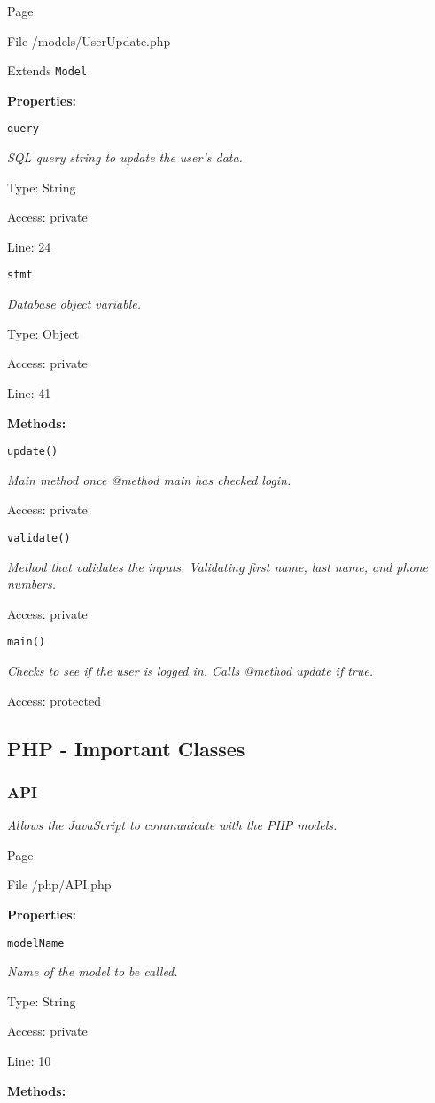 Page \pageref{UserUpdate.php}

File /models/UserUpdate.php

Extends \texttt{Model}

\textbf{Properties:}

\texttt{query}

{\scriptsize
\textit{SQL query string to update the user's data.}

Type: String

Access: private

Line: 24

}
\texttt{stmt}

{\scriptsize
\textit{Database object variable.}

Type: Object

Access: private

Line: 41

}
\textbf{Methods:}

\texttt{update()}

{\scriptsize
\textit{Main method once @method main has checked login.}

Access: private

}

\texttt{validate()}

{\scriptsize
\textit{Method that validates the inputs.
Validating first name, last name, and phone numbers.}

Access: private

}

\texttt{main()}

{\scriptsize
\textit{Checks to see if the user is logged in.
Calls @method update if true.}

Access: protected

}

\subsection{PHP - Important Classes}
\subsubsection{API}
\textit{Allows the JavaScript to communicate with the PHP models.}

Page \pageref{API.php}

File /php/API.php

\textbf{Properties:}

\texttt{modelName}

{\scriptsize
\textit{Name of the model to be called.}

Type: String

Access: private

Line: 10

}
\textbf{Methods:}

